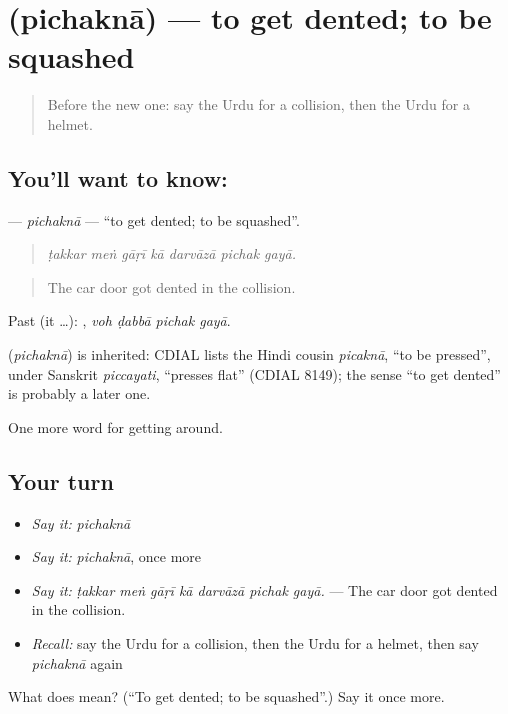 \section[\texorpdfstring{\ur{پچکنا} (pichaknā)}{پچکنا (pichaknā)}]{ (pichaknā) — to get dented; to be squashed}

\label{lesson:UR-C395-pichakna}



\begin{quote}
Before the new one: say the Urdu for a collision, then the Urdu for a helmet.
\end{quote}

\subsection*{You'll want to know: }
\textbf{} — \emph{pichaknā} — \textquotedblleft{}to get dented; to be squashed\textquotedblright{}.

\begin{quote}
      
\end{quote}

\begin{quote}
\emph{ṭakkar meṅ gāṛī kā darvāzā pichak gayā.}
\end{quote}

\begin{quote}
The car door got dented in the collision.
\end{quote}

Past (it …):    , \emph{voh ḍabbā pichak gayā}.

\begin{cousinweb}
\textbf{} (\emph{pichaknā}) is inherited: CDIAL lists the Hindi cousin \emph{picaknā}, \textquotedblleft{}to be pressed\textquotedblright{}, under Sanskrit \emph{piccayati}, \textquotedblleft{}presses flat\textquotedblright{} (CDIAL 8149); the sense \textquotedblleft{}to get dented\textquotedblright{} is probably a later one.
\end{cousinweb}

\begin{grammarlens}[title={What you've built}]
One more word for getting around.
\end{grammarlens}

\subsection*{Your turn}
\begin{itemize}
\raggedright
  \item \emph{Say it:} \emph{pichaknā}
  \item \emph{Say it:} \emph{pichaknā}, once more
  \item \emph{Say it:} \emph{ṭakkar meṅ gāṛī kā darvāzā pichak gayā.} — The car door got dented in the collision.
  \item \emph{Recall:} say the Urdu for a collision, then the Urdu for a helmet, then say \emph{pichaknā} again
\end{itemize}

\begin{tcolorbox}[breakable,colback=teal!4,colframe=teal!35!black,title={Before you move on}]
What does  mean? (\textquotedblleft{}To get dented; to be squashed\textquotedblright{}.) Say it once more.
\end{tcolorbox}
